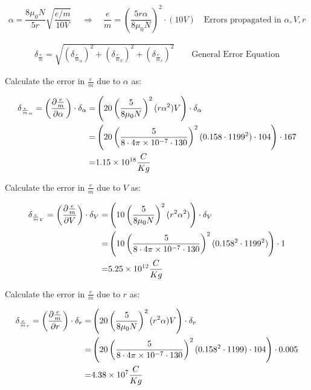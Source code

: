 \documentclass[12pt]{article}
\newcommand{\paren}[1]{\left( {#1} \right)}
\begin{document}
\begin{equation}
	\alpha = \frac{8\mu_0N}{5r}\sqrt{\frac{e/m}{10V}}\
	\quad \Rightarrow \quad
	\frac{e}{m}=\paren{\frac{5r\alpha}{8\mu_0N}}^2\cdot(10V)
	\quad \text{Errors propagated in }\alpha, V, r 
	\label{e:em_derive_FixV}
\end{equation}

\begin{align}
	\delta_\frac{e}{m}=\sqrt{\paren{\delta_{\frac{e}{m}_\alpha}}^2+\paren{\delta_{\frac{e}{m}_V}}^2+\paren{\delta_{\frac{e}{m}_r}}^2} \qquad \text{General Error Equation} \label{e:FixV_err}
\end{align}

Calculate the error in $\frac{e}{m}$ due to $\alpha$ as:

\begin{align}
	\delta_{\frac{e}{m}_\alpha} = \paren{\frac{\partial \frac{e}{m}}{\partial \alpha}}\cdot\delta_\alpha =& \paren{20\paren{\frac{5}{8\mu_0N}}^2(r\alpha^2)V}\cdot\delta_\alpha \label{e:FixV_err_alpha} \\
	=& \paren{20\paren{\frac{5}{8\cdot4\pi\times10^{-7}\cdot130}}^2(0.158\cdot1199^2)\cdot104}\cdot167 \notag \\
	=& 1.15\times10^{18} \frac{C}{Kg} \notag
\end{align}

Calculate the error in $\frac{e}{m}$ due to $V$ as:

\begin{align}
	\delta_{\frac{e}{m}_V} = \paren{\frac{\partial \frac{e}{m}}{\partial V}}\cdot\delta_V =& \paren{10\paren{\frac{5}{8\mu_0N}}^2(r^2\alpha^2)}\cdot \delta_V \label{e:FixV_err_V} \\
	=& \paren{10\paren{\frac{5}{8\cdot4\pi\times10^{-7}\cdot130}}^2(0.158^2\cdot1199^2)}\cdot1 \notag \\
	=& 5.25\times10^{12} \frac{C}{Kg} \notag
\end{align}

Calculate the error in $\frac{e}{m}$ due to $r$ as:

\begin{align}
	\delta_{\frac{e}{m}_r} = \paren{\frac{\partial \frac{e}{m}}{\partial r}}\cdot\delta_r =& \paren{20\paren{\frac{5}{8\mu_0N}}^2(r^2\alpha)V}\cdot \delta_r \label{e:FixV_err_r} \\
	=& \paren{20\paren{\frac{5}{8\cdot4\pi\times10^{-7}\cdot130}}^2(0.158^2\cdot1199)\cdot104}\cdot0.005 \notag \\
	=& 4.38\times10^7 \frac{C}{Kg} \notag
\end{align}
\end{document}

